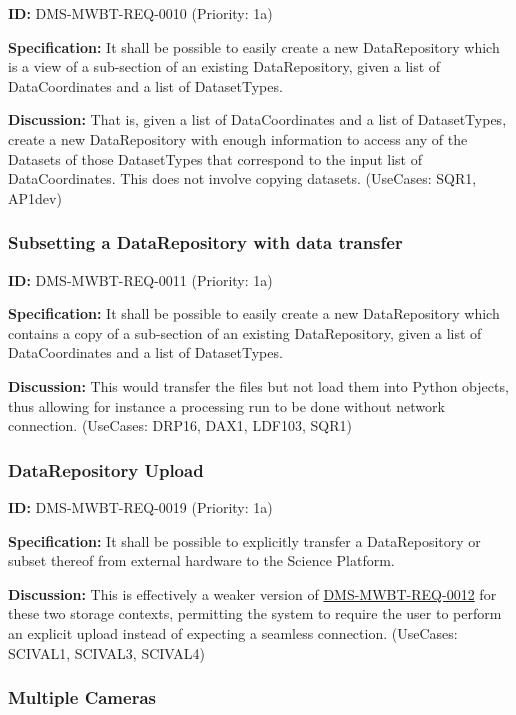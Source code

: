 \documentclass[SE,toc,lsstdraft]{lsstdoc}
\begin{document}
\label{DMS-MWBT-REQ-0010}
\textbf{ID:} DMS-MWBT-REQ-0010 (Priority: 1a)

\textbf{Specification:}
It shall be possible to easily create a new DataRepository which is a view of a sub-section of an existing DataRepository, given a list of DataCoordinates and a list of DatasetTypes.

\textbf{Discussion:}
That is, given a list of DataCoordinates and a list of DatasetTypes, create a new DataRepository with enough information to access any of the Datasets of those DatasetTypes that correspond to the input list of DataCoordinates. This does not involve copying datasets. (UseCases: SQR1, AP1dev)

\subsubsection{Subsetting a DataRepository with data transfer}

\label{DMS-MWBT-REQ-0011}
\textbf{ID:} DMS-MWBT-REQ-0011 (Priority: 1a)

\textbf{Specification:}
It shall be possible to easily create a new DataRepository which contains a copy of a sub-section of an existing DataRepository, given a list of DataCoordinates and a list of DatasetTypes.

\textbf{Discussion:}
This would transfer the files but not load them into Python objects, thus allowing for instance a processing run to be done without network connection. (UseCases: DRP16, DAX1, LDF103, SQR1)

\subsubsection{DataRepository Upload}

\label{DMS-MWBT-REQ-0019}
\textbf{ID:} DMS-MWBT-REQ-0019 (Priority: 1a)

\textbf{Specification:}
It shall be possible to explicitly transfer a DataRepository or subset thereof from external hardware to the Science Platform.

\textbf{Discussion:}
This is effectively a weaker version of \hyperref[DMS-MWBT-REQ-0012]{DMS-MWBT-REQ-0012} for these two storage contexts, permitting the system to require the user to perform an explicit upload instead of expecting a seamless connection. (UseCases: SCIVAL1, SCIVAL3, SCIVAL4)

\subsubsection{Multiple Cameras}
\end{document}
